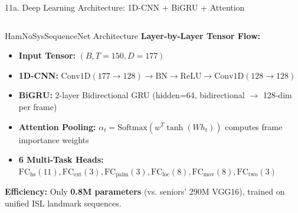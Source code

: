 \documentclass[aspectratio=169]{beamer}
\begin{document}
\begin{frame}[t]{11a. Deep Learning Architecture: 1D-CNN + BiGRU + Attention}
\begin{columns}[T]
    \begin{block}{HamNoSysSequenceNet Architecture}
        \fontsize{6.8pt}{8.6pt}\selectfont
        \textbf{Layer-by-Layer Tensor Flow:}
        \begin{itemize}\setlength{\itemsep}{1.2pt}
            \item \textbf{Input Tensor:} $(B, T=150, D=177)$
            \item \textbf{1D-CNN:} $\text{Conv1D}(177 \to 128) \to \text{BN} \to \text{ReLU} \to \text{Conv1D}(128 \to 128)$
            \item \textbf{BiGRU:} 2-layer Bidirectional GRU (hidden=64, bidirectional $\to$ 128-dim per frame)
            \item \textbf{Attention Pooling:} $\alpha_t = \text{Softmax}(w^T \tanh(W h_t))$ computes frame importance weights
            \item \textbf{6 Multi-Task Heads:}
                  $\text{FC}_{\text{hs}}(11), \text{FC}_{\text{ext}}(3), \text{FC}_{\text{palm}}(3), \text{FC}_{\text{loc}}(8), \text{FC}_{\text{mov}}(8), \text{FC}_{\text{two}}(3)$
        \end{itemize}
        \vspace{1mm}
        \textbf{Efficiency:} Only \textbf{0.8M parameters} (vs. seniors' 290M VGG16), trained on unified ISL landmark sequences.
    \end{block}
\end{columns}

\vspace{1.5mm}
\centering
{}
\end{frame}

\end{document}
